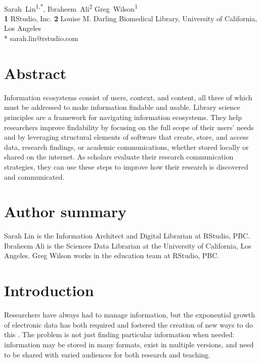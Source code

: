 \documentclass[10pt,letterpaper]{article}
\begin{document}
\vspace*{0.2in}

\begin{flushleft}
{\Large
\textbf{}
}
\newline
\\
{Sarah~Lin}\textsuperscript{1,*},
{Ibraheem~Ali}\textsuperscript{2}
{Greg~Wilson}\textsuperscript{1}
\\
\textbf{1} RStudio, Inc.
\textbf{2} Louise M. Darling Biomedical Library, University of California, Los Angeles
\\
\bigskip
* sarah.lin@rstudio.com
\end{flushleft}

\section*{Abstract}

Information ecosystems consist of users, context, and content, all three of
which must be addressed to make information findable and usable. Library science
principles are a framework for navigating information ecosystems. They help researchers
improve findability by focusing on the full scope of their users' needs and by leveraging 
structural elements of software that create, store, and access data,
research findings, or academic communications, whether stored locally or shared on the
internet. As scholars evaluate their research communication strategies,
they can use these steps to improve how their research is discovered and communicated.

\section*{Author summary}

Sarah Lin is the Information Architect and Digital Librarian at RStudio, PBC.
Ibraheem Ali is the Sciences Data Librarian at the University of California, Los Angeles.
Greg Wilson works in the education team at RStudio, PBC.

\section*{Introduction}

Researchers have always had to manage information, but the exponential growth of
electronic data has both required and fostered the creation of new ways to do
this \cite{Rosenfeld2015,Hedden2016}. The problem is not just finding particular
information when needed: information may be stored in many formats, exist in
multiple versions, and need to be shared with varied audiences for both research
and teaching.
\end{document}
